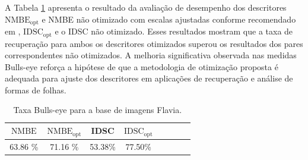 A Tabela \ref{table_bull_eyes_leaves} apresenta o resultado da avaliação de desempenho dos descritores $\operatorname{NMBE_{opt}}$ e NMBE não otimizado com escalas ajustadas conforme recomendado em \cite{Cesar:1996},  $\operatorname{IDSC_{opt}}$ e o IDSC não otimizado. Esses resultados mostram que a taxa de recuperação para ambos os descritores otimizados superou os resultados dos pares correspondentes não otimizados. A melhoria significativa observada nas medidas Bulls-eye reforça a hipótese de que a metodologia de otimização proposta é adequada para ajuste dos descritores em aplicações de recuperação e análise de formas de folhas.

\begin{table}[h!]
\centering
\caption{Taxa Bulls-eye para a base de imagens Flavia.}
\label{table_bull_eyes_leaves}
  \begin{tabular}{cccccccc}
  \toprule[1.5pt]
 $\operatorname{NMBE}$ & $\operatorname{NMBE_{opt}}$ & IDSC    & $\operatorname{IDSC_{opt}}$\\ \midrule
     63.86 \%  & 71.16 \%  & 53.38\%    & 77.50\%       \\
  \bottomrule[1.5pt]
  \end{tabular}
\end{table}

